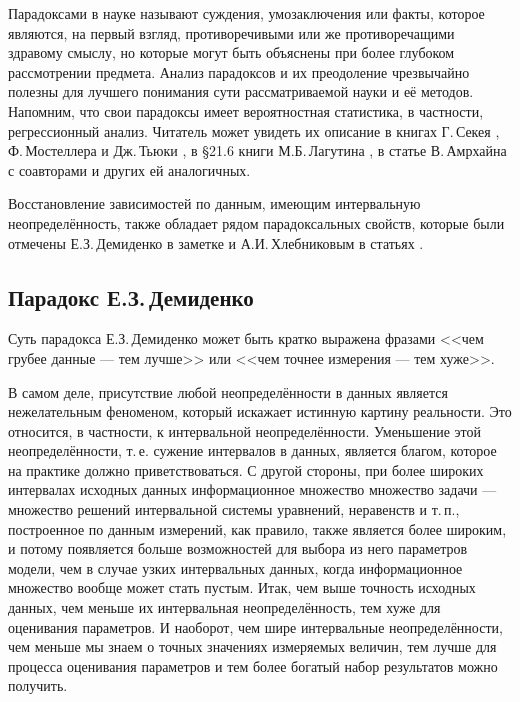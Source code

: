 \documentclass[a5paper,openany]{book}
\begin{document}
Парадоксами в науке называют суждения, умозаключения или факты, которое являются, 
на первый взгляд, противоречивыми или же противоречащими здравому смыслу, но которые 
могут быть объяснены при более глубоком рассмотрении предмета. Анализ парадоксов и 
их преодоление чрезвычайно полезны для лучшего понимания сути рассматриваемой науки 
и её методов. Напомним, что свои парадоксы имеет вероятностная статистика, в частности, 
регрессионный анализ. Читатель может увидеть их описание в книгах Г.\,Секея \cite{Sekei}, 
Ф.\,Мостеллера и Дж.\,Тьюки \cite{MostellerTukey}, в \S 21.6 книги М.Б.\,Лагутина 
\cite{Lagutin}, в статье В.\,Амрхайна с соавторами \cite{Amrhein2019} и других 
ей аналогичных. 
  
Восстановление зависимостей по данным, имеющим интервальную неопределённость, также 
обладает рядом парадоксальных свойств, которые были отмечены Е.З.\,Демиденко в заметке 
\cite{DemidenkoNote} и А.И.\,Хлебниковым в статьях  \cite{Khlebnikov1996,  Khlebnikov1999}. 
  

\subsection{Парадокс Е.З.\,Демиденко} 
\label{DemidParadoxSect} 
  
Суть парадокса Е.З.\,Демиденко может быть кратко выражена фразами <<чем грубее данные 
--- тем лучше>> или <<чем точнее измерения --- тем хуже>>.   
  
В самом деле, присутствие любой неопределённости в данных является нежелательным 
феноменом, который искажает истинную картину реальности. Это относится, в частности,
к интервальной неопределённости. Уменьшение этой неопределённости, т.\,е. сужение 
интервалов в данных, является благом, которое на практике должно приветствоваться. 
С другой стороны, при более широких интервалах исходных данных информационное 
множество множество задачи --- множество решений интервальной системы уравнений, 
неравенств и т.\,п., построенное по данным измерений, как правило, также является 
более широким, и потому появляется больше возможностей для выбора из него параметров 
модели, чем в случае узких интервальных данных, когда информационное множество вообще 
может стать пустым. Итак, чем выше точность исходных данных, чем меньше их интервальная 
неопределённость, тем хуже для оценивания параметров. И наоборот, чем шире интервальные 
неопределённости, чем меньше мы знаем о точных значениях измеряемых величин, тем лучше 
для процесса оценивания параметров и тем более богатый набор результатов можно получить. 
   
\end{document}
